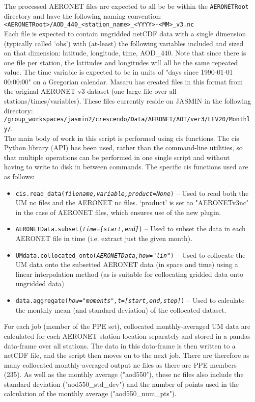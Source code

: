 \documentclass[10pt,a4paper]{article}
\newcommand\tab[1][0.5cm]{\hspace*{#1}}
\begin{document}
\noindent The processed AERONET files are expected to all be be within the \texttt{AERONETRoot} directory and have the following naming convention:\\
\tab \texttt{<AERONETRoot>/AOD\_440\_<station\_name>\_<YYYY>-<MM>\_v3.nc}\\
\noindent Each file is expected to contain ungridded netCDF data with a single dimension (typically called `obs') with (at-least) the following variables included and sized on that dimension: latitude, longitude, time, AOD\_440. Note that since there is one file per station, the latitudes and longitudes will all be the same repeated value. The time variable is expected to be in units of "days since 1990-01-01 00:00:00" on a Gregorian calendar. Masaru has created files in this format from the original AERONET v3 dataset (one large file over all stations/times/variables). These files currently reside on JASMIN in the following directory: \texttt{/group\_workspaces/jasmin2/crescendo/Data/AERONET/AOT/ver3/LEV20/Monthly/}.\\

\noindent The main body of work in this script is performed using cis functions. The cis Python library (API) has been used, rather than the command-line utilities, so that multiple operations can be performed in one single script and without having to write to disk in between commands. The specific cis functions used are as  follows:
\begin{itemize}
\item \texttt{cis.read\_data(\textit{filename,variable,product=None})} -- Used to read both the UM nc files and the AERONET nc files. `product' is set to "AERONETv3nc" in the case of AERONET files, which ensures use of the new plugin.
\item \texttt{AERONETData.subset(\textit{time=[start,end]})} -- Used to subset the data in each AERONET file in time (i.e. extract just the given month).
\item \texttt{UMdata.collocated\_onto(\textit{AERONETData,how="lin"})} -- Used to collocate the UM data onto the subsetted AERONET data (in space and time) using a linear interpolation method (as is suitable for collocating gridded data onto ungridded data)
\item \texttt{data.aggregate(\textit{how="moments",t=[start,end,step]})} -- Used to calculate the monthly mean (and standard deviation) of the collocated dataset.
\end{itemize}
For each job (member of the PPE set), collocated monthly-averaged UM data are calculated for each AERONET station location separately and stored in a pandas data-frame over all stations. The data in this data-frame is then written to a netCDF file, and the script then moves on to the next job. There are therefore as many collocated monthly-averaged output nc files as there are PPE members (235). As well as the monthly average ("aod550"), these nc files also include the standard deviation ("aod550\_std\_dev") and the number of points used in the calculation of the monthly average ("aod550\_num\_pts").
\end{document}
